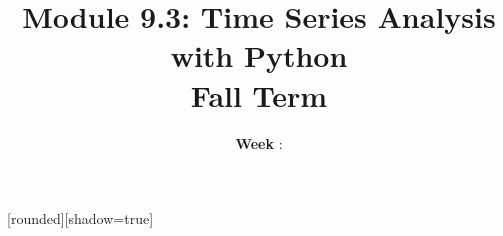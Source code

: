 

\usepackage{exscale,latexsym,microtype,amsmath,amssymb,amsfonts,graphicx,natbib,times,booktabs,xstring}

\newcommand{\E}{\ensuremath{{\mathbb E}}} %
\newcommand{\R}{\ensuremath{{\mathbb R}}}
\newcommand{\Var}{\ensuremath{{\mathbb V}}} %
\newcommand{\frameit}[2]{\begin{frame}\frametitle{#1}\begin{itemize}#2\end{itemize}\end{frame}}
\def\func#1{\mathop{\rm #1}}
\def\er#1{\emph{\color{red}#1}}
\def\newblock{\hskip .11em plus .33em minus .07em}
\def\limfunc#1{\mathop{\rm #1}}%
[rounded][shadow=true]
\date{}

\title{Module 9.3: Time Series Analysis with Python\\Fall Term\space\number\year}
\def\theweek{}
\author[Week \theweek]{\textbf{Week \theweek}:}

